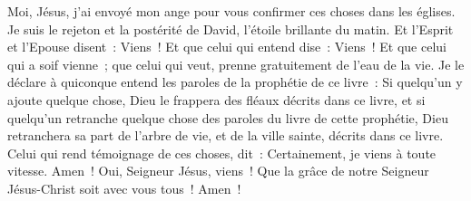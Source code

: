 \begin{multicols}{2}
Moi, Jésus, j'ai envoyé mon ange pour vous confirmer ces choses dans les églises. Je suis le rejeton et la postérité de David, l'étoile brillante du matin.
Et l'Esprit et l'Epouse disent~: Viens~! Et que celui qui entend dise~: Viens~! Et que celui qui a soif vienne~; que celui qui veut, prenne gratuitement de l'eau de la vie.
Je le déclare à quiconque entend les paroles de la prophétie de ce livre~: Si quelqu'un y ajoute quelque chose, Dieu le frappera des fléaux décrits dans ce livre,
et si quelqu'un retranche quelque chose des paroles du livre de cette prophétie, Dieu retranchera sa part de l'arbre de vie, et de la ville sainte, décrits dans ce livre.
Celui qui rend témoignage de ces choses, dit~: Certainement, je viens à toute vitesse. Amen~! Oui, Seigneur Jésus, viens~!
Que la grâce de notre Seigneur Jésus-Christ soit avec vous tous~! Amen~!
\PPE{}
\end{multicols}

